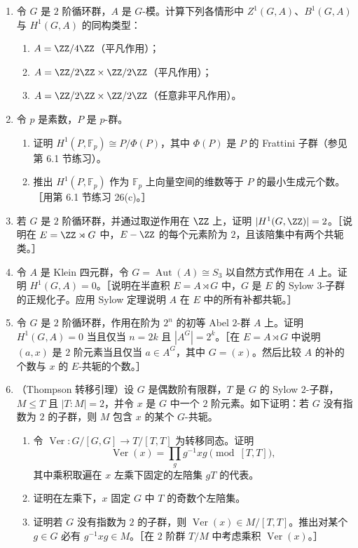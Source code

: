 \begin{enumerate}[label=\arabic*.]
  \item 令 $G$ 是 $2$ 阶循环群，$A$ 是 $G$-模。计算下列各情形中 $Z^1(G,A)$、$B^1(G,A)$ 与 $H^1(G,A)$ 的同构类型：
  \begin{enumerate}[label=(\alph*)]
    \item $A=\ZZ/4\ZZ$（平凡作用）；
    \item $A=\ZZ/2\ZZ\times\ZZ/2\ZZ$（平凡作用）；
    \item $A=\ZZ/2\ZZ\times\ZZ/2\ZZ$（任意非平凡作用）。
  \end{enumerate}

  \item 令 $p$ 是素数，$P$ 是 $p$-群。
  \begin{enumerate}[label=(\alph*)]
    \item 证明 $H^1(P,\mathbb F_p)\cong P/\Phi(P)$，其中 $\Phi(P)$ 是 $P$ 的 Frattini 子群（参见第 6.1 节练习）。
    \item 推出 $H^1(P,\mathbb F_p)$ 作为 $\mathbb F_p$ 上向量空间的维数等于 $P$ 的最小生成元个数。［用第 6.1 节练习 26(c)。］
  \end{enumerate}

  \item 若 $G$ 是 $2$ 阶循环群，并通过取逆作用在 $\ZZ$ 上，证明 $|H^1(G,\ZZ)|=2$。［说明在 $E=\ZZ\rtimes G$ 中，$E-\ZZ$ 的每个元素阶为 $2$，且该陪集中有两个共轭类。］

  \item 令 $A$ 是 Klein 四元群，令 $G=\operatorname{Aut}(A)\cong S_3$ 以自然方式作用在 $A$ 上。证明 $H^1(G,A)=0$。［说明在半直积 $E=A\rtimes G$ 中，$G$ 是 $E$ 的 Sylow $3$-子群的正规化子。应用 Sylow 定理说明 $A$ 在 $E$ 中的所有补都共轭。］

  \item 令 $G$ 是 $2$ 阶循环群，作用在阶为 $2^n$ 的初等 Abel $2$-群 $A$ 上。证明 $H^1(G,A)=0$ 当且仅当 $n=2k$ 且 $|A^G|=2^k$。［在 $E=A\rtimes G$ 中说明 $(a,x)$ 是 $2$ 阶元素当且仅当 $a\in A^G$，其中 $G=(x)$。然后比较 $A$ 的补的个数与 $x$ 的 $E$-共轭的个数。］

  \item （Thompson 转移引理）设 $G$ 是偶数阶有限群，$T$ 是 $G$ 的 Sylow $2$-子群，$M\leq T$ 且 $|T:M|=2$，并令 $x$ 是 $G$ 中一个 $2$ 阶元素。如下证明：若 $G$ 没有指数为 $2$ 的子群，则 $M$ 包含 $x$ 的某个 $G$-共轭。
  \begin{enumerate}[label=(\alph*)]
    \item 令 $\operatorname{Ver}:G/[G,G]\to T/[T,T]$ 为转移同态。证明
    \[
      \operatorname{Ver}(x)=\prod_g g^{-1}xg\pmod{[T,T]},
    \]
    其中乘积取遍在 $x$ 左乘下固定的左陪集 $gT$ 的代表。
    \item 证明在左乘下，$x$ 固定 $G$ 中 $T$ 的奇数个左陪集。
    \item 证明若 $G$ 没有指数为 $2$ 的子群，则 $\operatorname{Ver}(x)\in M/[T,T]$。推出对某个 $g\in G$ 必有 $g^{-1}xg\in M$。［在 $2$ 阶群 $T/M$ 中考虑乘积 $\operatorname{Ver}(x)$。］
  \end{enumerate}


\end{enumerate}
